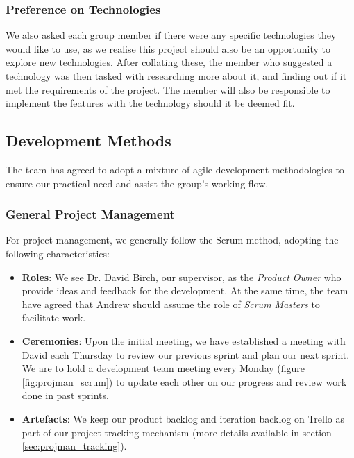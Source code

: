 \documentclass[a4paper, titlepage]{article}
\begin{document}
\subsubsection{Preference on Technologies}
We also asked each group member if there were any specific technologies they 
would like to use, as we realise this project should also be an opportunity to explore new
technologies. After collating these, the member who suggested a technology was then 
tasked with researching more about it, and finding out if it met the requirements of the project.
The member will also be responsible to implement the features with the technology should it be
deemed fit.



\subsection{Development Methods} \label{sec:projman_devprocess}
The team has agreed to adopt a mixture of agile development methodologies to
ensure our practical need and assist the group's working flow.

\subsubsection{General Project Management}

For project management, we generally follow the Scrum method, adopting the
following characteristics:
\begin{itemize}
  \item \textbf{Roles}: We see Dr. David Birch, our supervisor, as the \textit{Product Owner}
        who provide ideas and feedback for the development. At the same time,
        the team have agreed that Andrew should assume the role of
        \textit{Scrum Masters} to facilitate work.
  \item \textbf{Ceremonies}: Upon the initial meeting, we have established a
        meeting with David each Thursday to review our previous sprint 
        and plan our next sprint. We are to hold a development team
        meeting every Monday (figure \ref{fig:projman_scrum}) to update each other 
        on our progress and review work done in past sprints.
  \item \textbf{Artefacts}: We keep our product backlog and iteration backlog on
        Trello as part of our project tracking mechanism (more details
        available in section \ref{sec:projman_tracking}).
\end{itemize}
\end{document}
